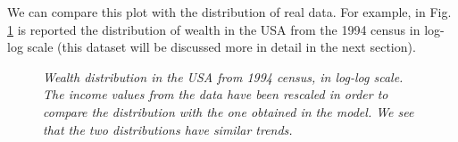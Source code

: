 We can compare this plot with the distribution of real data.
For example, in Fig. \ref{fig:savingsLog} is reported the distribution of wealth in the USA from the 1994 census in log-log scale (this dataset will be discussed more in detail in the next section).
\begin{figure}[H]
    \centering
    \scalebox{.7}{}
    \caption{\emph{Wealth distribution in the USA from 1994 census, in log-log scale.
					The income values from the data have been rescaled in order to compare the distribution with the one obtained in the model.
					We see that the two distributions have similar trends.}}
    \label{fig:savingsLog}
\end{figure}
